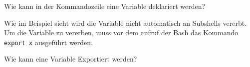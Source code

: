 \begin{flashcard}[Command]{Wie kann in der Kommandozeile eine Variable deklariert werden?}
	
	
	Wie im Beispiel sieht wird die Variable nicht automatisch an Subshells vererbt. Um die Variable zu vererben, muss vor dem aufruf der Bash das Kommando \texttt{export x} ausgeführt werden.
\end{flashcard}

\begin{flashcard}[Command]{Wie kann eine Variable Exportiert werden?}
	
\end{flashcard}

\begin{flashcard}[TO DO]{}	
\end{flashcard}